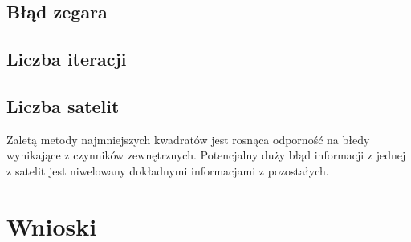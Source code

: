 \documentclass{article}
\begin{document}
\subsection{Błąd zegara}



\subsection{Liczba iteracji}


\subsection{Liczba satelit}

Zaletą metody najmniejszych kwadratów jest rosnąca odporność na błedy wynikające z czynników zewnętrznych. Potencjalny duży błąd informacji z jednej z satelit jest niwelowany dokładnymi informacjami z pozostałych.

\section{Wnioski}

	 	 
\end{document}
